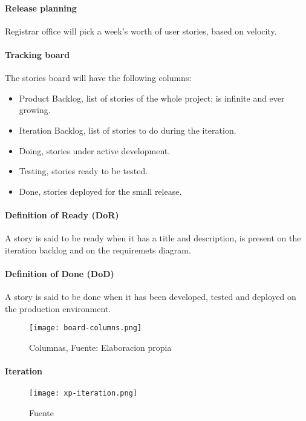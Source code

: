 \paragraph{Release planning} Registrar office will pick a week's worth of user stories, based on velocity.

\paragraph{Tracking board} The stories board will have the following columns:
\begin{itemize}
    \item Product Backlog, list of stories of the whole project; is infinite and ever growing.
    \item Iteration Backlog, list of stories to do during the iteration.
    \item Doing, stories under active development.
    \item Testing, stories ready to be tested.
    \item Done, stories deployed for the small release.
\end{itemize}

\paragraph{Definition of Ready (DoR)} A story is said to be ready when it has a title and description, is present on the iteration backlog and on the requiremets diagram.

\paragraph{Definition of Done (DoD)} A story is said to be done when it has been developed, tested and deployed on the production environment.

\begin{figure}
    \texttt{[image: board-columns.png]}
    \caption{Columnas, Fuente: Elaboracion propia}\label{fig:board-columns}
\end{figure}

\paragraph{Iteration}

\begin{figure}
    \texttt{[image: xp-iteration.png]}
    \caption{Fuente \textcite{XpWeb}}\label{fig:xp-iteration}
\end{figure}


